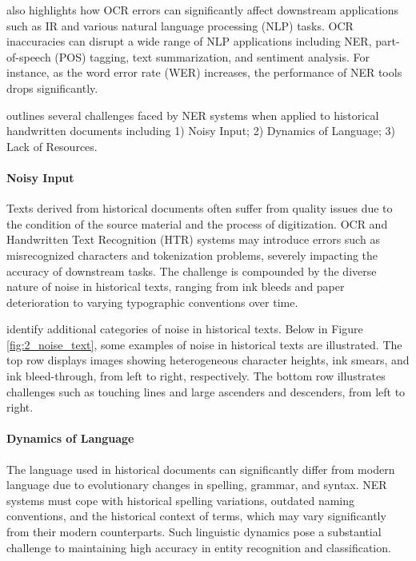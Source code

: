 \cite{nguyen2021survey} also highlights how OCR errors can significantly affect downstream applications such as IR and various natural language processing (NLP) tasks. OCR inaccuracies can disrupt a wide range of NLP applications including NER, part-of-speech (POS) tagging, text summarization, and sentiment analysis. For instance, as the word error rate (WER) increases, the performance of NER tools drops significantly.


\cite{ehrmann2023named} outlines several challenges faced by NER systems when applied to historical handwritten documents including 1) Noisy Input; 2) Dynamics of Language; 3) Lack of Resources. 

\paragraph*{Noisy Input}
\label{par:1_noisy_input}
Texts derived from historical documents often suffer from quality issues due to the condition of the source material and the process of digitization. OCR and Handwritten Text Recognition (HTR) systems may introduce errors such as misrecognized characters and tokenization problems, severely impacting the accuracy of downstream tasks. The challenge is compounded by the diverse nature of noise in historical texts, ranging from ink bleeds and paper deterioration to varying typographic conventions over time. 

\cite{kurar2020learning} identify additional categories of noise in historical texts. Below in Figure \ref{fig:2_noise_text}, some examples of noise in historical texts are illustrated. The top row displays images showing heterogeneous character heights, ink smears, and ink bleed-through, from left to right, respectively. The bottom row illustrates challenges such as touching lines and large ascenders and descenders, from left to right.


\paragraph*{Dynamics of Language}
\label{par:1_dynamics_of_language}
The language used in historical documents can significantly differ from modern language due to evolutionary changes in spelling, grammar, and syntax. NER systems must cope with historical spelling variations, outdated naming conventions, and the historical context of terms, which may vary significantly from their modern counterparts. Such linguistic dynamics pose a substantial challenge to maintaining high accuracy in entity recognition and classification.


